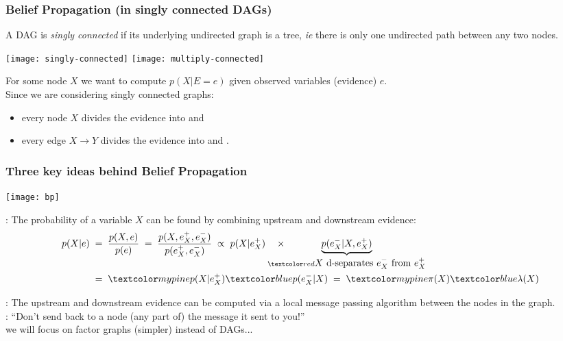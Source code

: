 \begin{frame}
\frametitle{Belief Propagation (in singly connected DAGs)}

 A DAG is {\em singly connected} if its underlying
undirected graph is a tree, \emph{ie} there is only one undirected
path between any two nodes. 

\vspace*{1mm}
\centerline{
\texttt{[image: singly-connected]} \hspace*{2ex}
\texttt{[image: multiply-connected]}
}
\vspace*{1mm}

 For some node $X$ we want to compute $p(X|E=e)$ given
observed variables (evidence) $e$. \\

Since we are considering singly connected graphs:
%
\begin{itemize}
\item every node $X$ divides the evidence into  and
\item every edge $X\rightarrow Y$ divides the evidence into
   and . 
\end{itemize}
\end{frame}
\begin{frame}
\frametitle{Three key ideas behind Belief Propagation}

\centerline{\texttt{[image: bp]}}

: The probability of a variable $X$ can be found by
combining upstream and downstream evidence:  
\begin{equation*}
\begin{split}
p(X|e)\;=&\;\;\frac{p(X,e)}{p(e)}\;=\;\frac{p(X,e^+_X,e^-_X)}{p(e^+_X,e^-_X)}
\;\propto\;p(X|e^+_X)\quad\times\hspace{-2em}\underset{\Red{\mbox{$X$ d-separates $e_X^-$ from $e_X^+$}}}{\underbrace{p(e^-_X|X,e_X^+)}}\\
=&\;\;\Green{p(X|e_X^+)}\Blue{p(e^-_X|X)}\;=\;\Green{\pi(X)}\Blue{\lambda(X)}
\end{split}
\end{equation*} \vspace*{-2em}

: The upstream and downstream evidence can be computed via a local message passing algorithm between the nodes in the graph. \\

: ``Don't send back to a node (any part of) the message it
sent to you!''\\[2ex]

we will focus on factor graphs (simpler) instead of DAGs...

\end{frame}

